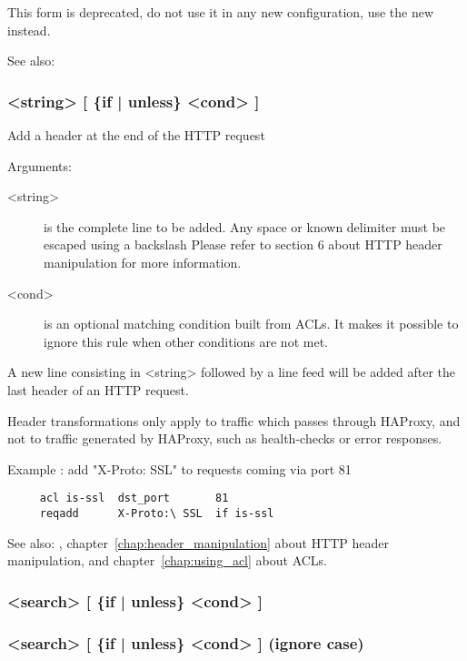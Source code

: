 {  This form is deprecated, do not use it in any new configuration, use the new
   instead.

  See also: 

\subsubsection[reqadd]{  <string> [ \{if | unless\} <cond> ]}


  Add a header at the end of the HTTP request


  Arguments:
  
\begin{description}
\item[<string>]
              is the complete line to be added. Any space or known delimiter
              must be escaped using a backslash \chr{\bslash} Please refer to section
              6 about HTTP header manipulation for more information.

\item[<cond>]
              is an optional matching condition built from ACLs. It makes it
              possible to ignore this rule when other conditions are not met.
\end{description}

  A new line consisting in <string> followed by a line feed will be added after
  the last header of an HTTP request.

  Header transformations only apply to traffic which passes through HAProxy,
  and not to traffic generated by HAProxy, such as health-checks or error
  responses.

  Example : add "X-Proto: SSL" to requests coming via port 81
\begin{verbatim}
     acl is-ssl  dst_port       81
     reqadd      X-Proto:\ SSL  if is-ssl
\end{verbatim}

  See also: , chapter~\ref{chap:header_manipulation} about HTTP header manipulation,
            and chapter~\ref{chap:using_acl} about ACLs.

\subsubsection[reqallow]{  <search> [ \{if | unless\} <cond> ]}
\subsubsection[reqiallow]{ <search> [ \{if | unless\} <cond> ] (ignore case)}

}
